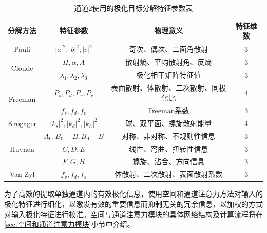 \begin{table}[ht!]
    \caption{通道2使用的极化目标分解特征参数表}
    \label{tab:decomposition_features}
    \centering
    \begin{tabular}{cccc}
        \toprule[1.5bp]
        分解方法                     & 特征参数                                                             & 物理意义               & 特征维数 \\
        \midrule[0.75bp]
        Pauli                    & $\left| a \right|^2,\left| b \right|^2,\left| c \right|^2$       & 奇次、偶次、二面角散射        & 3    \\
        \multirow{2}{*}{Cloude}  & $H,\alpha,A$                                                     & 散射熵、平均散射角、反熵       & 3    \\
                                 & $\lambda_1,\lambda_2,\lambda_3$                                  & 极化相干矩阵特征值          & 3    \\
        \multirow{2}{*}{Freeman} & $P_s,P_d,P_v,P_r$                                                & 表面散射、体散射、二次散射、同极化比 & 4    \\
                                 & $f_s,f_d,f_v$                                                    & Freeman系数          & 3    \\
        Krogager                 & $\left| k_s \right|^2,\left| k_d \right|^2,\left| k_h \right|^2$ & 球、双平面、螺旋散射能量       & 4    \\
        \multirow{3}{*}{Huynen}  & $A_0,B_0+B,B_0-B$                                                & 对称、非对称、不规则性信息      & 3    \\
                                 & $C,D,E$                                                          & 线性、弯曲、扭转性信息        & 3    \\
                                 & $F,G,H$                                                          & 螺旋、沾合、方向信息         & 3    \\
        Van Zyl                  & $f_v,f_d,f_s$                                                    & 体散射、二次散射、表面散射系数    & 3    \\
        \bottomrule[1.5bp]
    \end{tabular}
\end{table}

为了高效的提取单独通道内的有效极化信息，使用空间和通道注意力方法对输入的极化特征进行细化，以激发有效的重要信息而抑制无关的冗余信息，以加权的方式对输入极化特征进行校准。空间与通道注意力模块的具体网络结构及计算流程将在\ref{sec:空间和通道注意力模块}小节中介绍。

